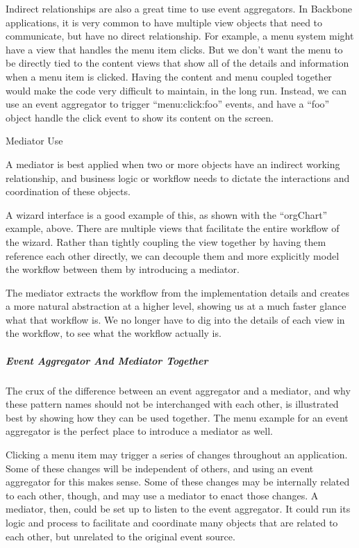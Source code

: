\documentclass[9pt]{book}
\begin{document}
Indirect relationships are also a great time to use event aggregators.
In Backbone applications, it is very common to have multiple view
objects that need to communicate, but have no direct relationship. For
example, a menu system might have a view that handles the menu item
clicks. But we don't want the menu to be directly tied to the content
views that show all of the details and information when a menu item is
clicked. Having the content and menu coupled together would make the
code very difficult to maintain, in the long run. Instead, we can use an
event aggregator to trigger ``menu:click:foo'' events, and have a
``foo'' object handle the click event to show its content on the screen.

Mediator Use

A mediator is best applied when two or more objects have an indirect
working relationship, and business logic or workflow needs to dictate
the interactions and coordination of these objects.

A wizard interface is a good example of this, as shown with the
``orgChart'' example, above. There are multiple views that facilitate
the entire workflow of the wizard. Rather than tightly coupling the view
together by having them reference each other directly, we can decouple
them and more explicitly model the workflow between them by introducing
a mediator.

The mediator extracts the workflow from the implementation details and
creates a more natural abstraction at a higher level, showing us at a
much faster glance what that workflow is. We no longer have to dig into
the details of each view in the workflow, to see what the workflow
actually is.

\subparagraph{Event Aggregator And Mediator
Together}\label{event-aggregator-and-mediator-together}

The crux of the difference between an event aggregator and a mediator,
and why these pattern names should not be interchanged with each other,
is illustrated best by showing how they can be used together. The menu
example for an event aggregator is the perfect place to introduce a
mediator as well.

Clicking a menu item may trigger a series of changes throughout an
application. Some of these changes will be independent of others, and
using an event aggregator for this makes sense. Some of these changes
may be internally related to each other, though, and may use a mediator
to enact those changes. A mediator, then, could be set up to listen to
the event aggregator. It could run its logic and process to facilitate
and coordinate many objects that are related to each other, but
unrelated to the original event source.
\end{document}
